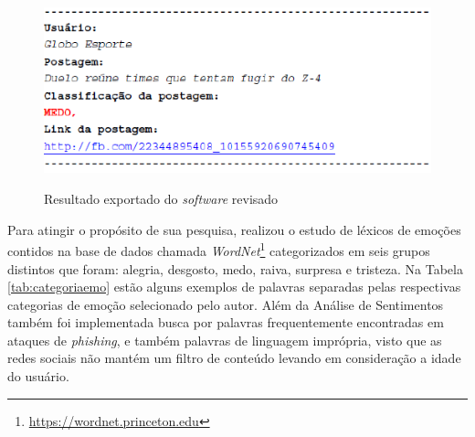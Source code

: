 \begin{figure}[!h]
\centering 
\caption{Resultado exportado do \textit{software} revisado}
\includegraphics[scale=0.60]{imagens/exportadofilipe.png}
\label{fig:exportadotccfilipe}
\end{figure}

\newpage
Para atingir o propósito de sua pesquisa,  realizou o estudo de léxicos de emoções contidos na base de dados chamada \textit{WordNet}\footnote{\url{https://wordnet.princeton.edu}} categorizados em seis grupos distintos que foram: alegria, desgosto, medo, raiva, surpresa e tristeza. Na Tabela \ref{tab:categoriaemo} estão alguns exemplos de palavras separadas pelas respectivas categorias de emoção selecionado pelo autor. Além da Análise de Sentimentos também foi implementada busca por palavras frequentemente encontradas em ataques de \textit{phishing},  e também palavras de linguagem imprópria, visto que as redes sociais não mantém um filtro de conteúdo levando em consideração a idade do usuário.

